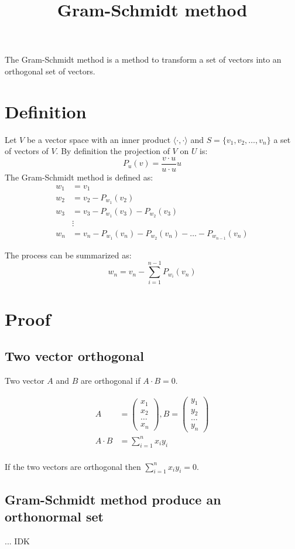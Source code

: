 \documentclass{article}
\begin{document}
\title{Gram-Schmidt method}
The Gram-Schmidt method is a method to transform a set of vectors into an orthogonal set of vectors.

\section{Definition}

Let $V$ be a vector space with an inner product $\langle\cdot,\cdot\rangle$ and $S = \{v_1, v_2, \dots, v_n\}$ a set of vectors of $V$.
By definition the projection of $V$ on $U$ is:
\begin{equation}
    P_u(v) = \frac{v \cdot u}{u \cdot u}u
\end{equation}
The Gram-Schmidt method is defined as:
\begin{equation}
    \begin{split}
        w_1 & = v_1 \\
        w_2 & = v_2 - P_{w_1}(v_2) \\
        w_3 & = v_3 - P_{w_1}(v_3) - P_{w_2}(v_3) \\
        & \vdots \\
        w_n & = v_n - P_{w_1}(v_n) - P_{w_2}(v_n) - \dots - P_{w_{n-1}}(v_n)
    \end{split}
\end{equation}

The process can be summarized as:
\begin{equation}
    w_n = v_n - \sum_{i=1}^{n-1} P_{w_i}(v_n)
\end{equation}

\section{Proof}

\subsection{Two vector orthogonal}

Two vector $A$ and $B$ are orthogonal if $A \cdot B = 0$.

\begin{equation}
    \begin{split}
        A & = \begin{pmatrix}x_1 \\ x_2 \\ \dots \\ x_n\end{pmatrix},
            B = \begin{pmatrix} y_1 \\ y_2 \\ \dots \\ y_n\end{pmatrix} \\
        A \cdot B & = \sum_{i=1}^n x_iy_i \\
    \end{split}
\end{equation}

If the two vectors are orthogonal then $\sum_{i=1}^{n} x_iy_i = 0$.

\subsection{Gram-Schmidt method produce an orthonormal set}

... IDK
\end{document}
